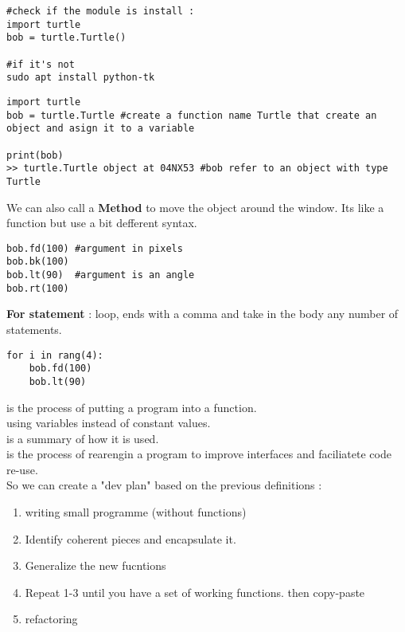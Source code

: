 \documentclass{report}
\begin{document}
\begin{verbatim}
#check if the module is install : 
import turtle
bob = turtle.Turtle()

#if it's not 
sudo apt install python-tk
\end{verbatim}

\begin{verbatim}
import turtle
bob = turtle.Turtle #create a function name Turtle that create an object and asign it to a variable

print(bob)
>> turtle.Turtle object at 04NX53 #bob refer to an object with type Turtle
\end{verbatim}
We can also call a \textbf{Method} to move the object around the window. Its like
a function but use a bit defferent syntax.
\begin{verbatim}
bob.fd(100) #argument in pixels
bob.bk(100)
bob.lt(90)  #argument is an angle
bob.rt(100)
\end{verbatim}

\textbf{For statement} : loop, ends with a comma and take 
in the body any number of statements.
\begin{verbatim}
for i in rang(4):
    bob.fd(100)
    bob.lt(90)
\end{verbatim}

 is the process of putting a program into a function.\\
 using variables instead of constant values.\\
 is a summary of how it is used.\\
 is the process of rearengin a program to improve interfaces 
and faciliatete code re-use.\\

So we can create a "dev plan" based on the previous definitions : 
\begin{enumerate}
    \item writing small programme (without functions)
    \item Identify coherent pieces and encapsulate it.
    \item Generalize the new fucntions
    \item Repeat 1-3 until you have a set of working functions. then copy-paste
    \item refactoring
\end{enumerate}
\end{document}

